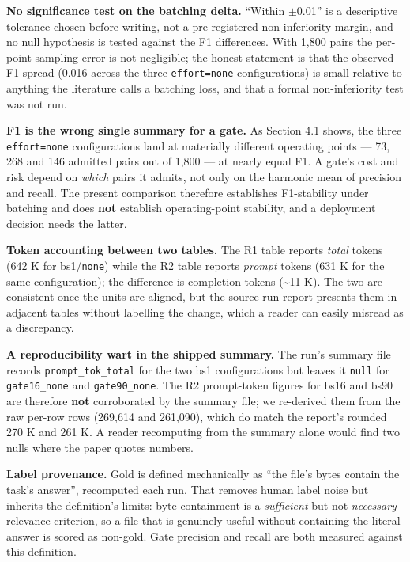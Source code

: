 \documentclass[10pt]{article}
\begin{document}
\textbf{No significance test on the batching delta.} ``Within $\pm$0.01'' is a descriptive tolerance chosen before writing, not a pre-registered non-inferiority margin, and no null hypothesis is tested against the F1 differences. With 1,800 pairs the per-point sampling error is not negligible; the honest statement is that the observed F1 spread (0.016 across the three \texttt{effort=none} configurations) is small relative to anything the literature calls a batching loss, and that a formal non-inferiority test was not run.

\textbf{F1 is the wrong single summary for a gate.} As Section 4.1 shows, the three \texttt{effort=none} configurations land at materially different operating points --- 73, 268 and 146 admitted pairs out of 1,800 --- at nearly equal F1. A gate's cost and risk depend on \emph{which} pairs it admits, not only on the harmonic mean of precision and recall. The present comparison therefore establishes F1-stability under batching and does \textbf{not} establish operating-point stability, and a deployment decision needs the latter.

\textbf{Token accounting between two tables.} The R1 table reports \emph{total} tokens (642 K for bs1/\texttt{none}) while the R2 table reports \emph{prompt} tokens (631 K for the same configuration); the difference is completion tokens (\textasciitilde{}11 K). The two are consistent once the units are aligned, but the source run report presents them in adjacent tables without labelling the change, which a reader can easily misread as a discrepancy.

\textbf{A reproducibility wart in the shipped summary.} The run's summary file records \texttt{prompt\_tok\_total} for the two bs1 configurations but leaves it \texttt{null} for \texttt{gate16\_none} and \texttt{gate90\_none}. The R2 prompt-token figures for bs16 and bs90 are therefore \textbf{not} corroborated by the summary file; we re-derived them from the raw per-row rows (269,614 and 261,090), which do match the report's rounded 270 K and 261 K. A reader recomputing from the summary alone would find two nulls where the paper quotes numbers.

\textbf{Label provenance.} Gold is defined mechanically as ``the file's bytes contain the task's answer'', recomputed each run. That removes human label noise but inherits the definition's limits: byte-containment is a \emph{sufficient} but not \emph{necessary} relevance criterion, so a file that is genuinely useful without containing the literal answer is scored as non-gold. Gate precision and recall are both measured against this definition.
\end{document}
